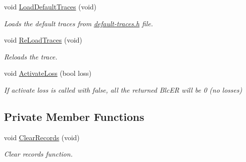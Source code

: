 \begin{DoxyCompactItemize}
void \hyperlink{classns3_1_1SNRToBlockErrorRateManager_a50f8ba371742a7d083b1092ea85b51c1}{Load\+Default\+Traces} (void)
\begin{DoxyCompactList}\small\item\em Loads the default traces from \hyperlink{default-traces_8h}{default-\/traces.\+h} file. \end{DoxyCompactList}\item 
void \hyperlink{classns3_1_1SNRToBlockErrorRateManager_a65363890767d423f9f97f9e9b038dda4}{Re\+Load\+Traces} (void)
\begin{DoxyCompactList}\small\item\em Reloads the trace. \end{DoxyCompactList}\item 
void \hyperlink{classns3_1_1SNRToBlockErrorRateManager_a24d99d7e425d20151984572876ee88c5}{Activate\+Loss} (bool loss)
\begin{DoxyCompactList}\small\item\em If activate loss is called with false, all the returned Blc\+ER will be 0 (no losses) \end{DoxyCompactList}\end{DoxyCompactItemize}
\subsection*{Private Member Functions}
\begin{DoxyCompactItemize}
\item 
void \hyperlink{classns3_1_1SNRToBlockErrorRateManager_a164e69eaafc229e1f98a80175481e101}{Clear\+Records} (void)
\begin{DoxyCompactList}\small\item\em Clear records function. \end{DoxyCompactList}\end{DoxyCompactItemize}

